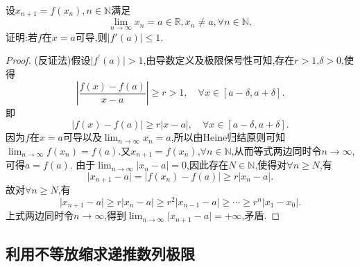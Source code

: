 \documentclass[../../main.tex]{subfiles}%
\begin{document}
\begin{proposition}[反向压缩映像]\label{proposition:反向压缩映像}
设\(x_{n + 1} = f(x_n),n\in\mathbb{N}\)满足
\[
\lim_{n \to \infty} x_n = a\in\mathbb{R},x_n\neq a,\forall n\in\mathbb{N},
\]
证明:若\(f\)在\(x = a\)可导,则\(\vert f'(a)\vert\leqslant  1\).
\end{proposition}
\begin{proof}

(反证法)假设\(\vert f^\prime(a)\vert > 1\),由导数定义及极限保号性可知,存在\(r > 1\),\(\delta > 0\),使得
\[
\left\vert\frac{f(x) - f(a)}{x - a}\right\vert\geqslant r > 1, \quad\forall x\in [a - \delta, a + \delta].
\]
即
\[
\vert f(x) - f(a)\vert\geqslant r\vert x - a\vert, \quad\forall x\in [a - \delta, a + \delta].
\]
因为\(f\)在\(x = a\)可导以及\(\lim_{n\rightarrow\infty}x_n = a\),所以由Heine归结原则可知\(\lim_{n\rightarrow\infty}f(x_n) = f(a)\).又\(x_{n + 1} = f(x_n)\),\(\forall n\in\mathbb{N}\),从而等式两边同时令\(n\rightarrow\infty\),可得\(a = f(a)\).
由于\(\lim_{n\rightarrow\infty}\vert x_n - a\vert = 0\),因此存在\(N\in\mathbb{N}\),使得对\(\forall n\geqslant N\),有
\[
\vert x_{n + 1} - a\vert = \vert f(x_n) - f(a)\vert\geqslant r\vert x_n - a\vert.
\]
故对\(\forall n\geqslant N\),有
\[
\vert x_{n + 1} - a\vert\geqslant r\vert x_n - a\vert\geqslant r^2\vert x_{n - 1} - a\vert\geqslant\cdots\geqslant r^n\vert x_1 - x_0\vert.
\]
上式两边同时令\(n\rightarrow\infty\),得到\(\lim_{n\rightarrow\infty}\vert x_{n + 1} - a\vert = +\infty\),矛盾.

\end{proof}


\subsection{利用不等放缩求递推数列极限}
\end{document}
